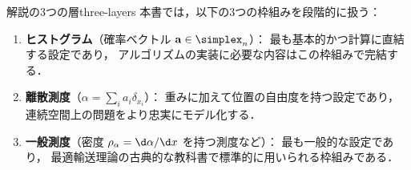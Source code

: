\begin{remark}{解説の3つの層}{three-layers}
  本書では，以下の3つの枠組みを段階的に扱う：
  \begin{enumerate}
    \item \textbf{ヒストグラム}（確率ベクトル $\mathbf{a} \in \simplex_n$）：
      最も基本的かつ計算に直結する設定であり，
      アルゴリズムの実装に必要な内容はこの枠組みで完結する．
    \item \textbf{離散測度}（$\alpha = \sum_i a_i \delta_{x_i}$）：
      重みに加えて位置の自由度を持つ設定であり，
      連続空間上の問題をより忠実にモデル化する．
    \item \textbf{一般測度}（密度 $\rho_\alpha = \d\alpha / \d x$ を持つ測度など）：
      最も一般的な設定であり，
      最適輸送理論の古典的な教科書で標準的に用いられる枠組みである．
  \end{enumerate}
\end{remark}
